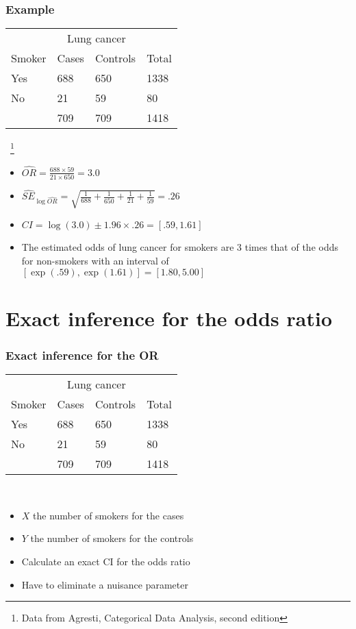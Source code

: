 \documentclass[aspectratio=169]{beamer}
\begin{document}
\begin{frame}\frametitle{Example}
\begin{center}
\ttfamily
  \begin{tabular}{llll}
& \multicolumn{2}{c}{Lung cancer} & \\ \cline{2-3}
Smoker & Cases & Controls & Total \\ \hline
Yes & 688 & 650 & 1338 \\
No  & 21  & 59  &   80 \\ \hline
    & 709 & 709 & 1418 
  \end{tabular}
\normalfont
\end{center}
~\footnote{Data from Agresti, Categorical Data Analysis, second edition}
\begin{itemize}
\item $\hat{OR} = \frac{688 \times 59}{21 \times 650} = 3.0$
\item $\hat{SE}_{\log \hat{OR}} = \sqrt{\frac{1}{688} + \frac{1}{650} + \frac{1}{21} + \frac{1}{59}} = .26$
\item $CI = \log(3.0) \pm 1.96 \times .26 = [.59, 1.61]$
\item The estimated odds of lung cancer for smokers are $3$ times
  that of the odds for non-smokers with an interval of 
  $[\exp(.59), \exp(1.61)] = [1.80, 5.00]$
\end{itemize}
\end{frame}

\section{Exact inference for the odds ratio}
\begin{frame}\frametitle{Exact inference for the OR}
\begin{center}
\ttfamily
  \begin{tabular}{llll}
& \multicolumn{2}{c}{Lung cancer} & \\ \cline{2-3}
Smoker & Cases & Controls & Total \\ \hline
Yes & 688 & 650 & 1338 \\
No  & 21  & 59  &   80 \\ \hline
    & 709 & 709 & 1418 
  \end{tabular}
\normalfont
\end{center}\ \\
\begin{itemize}
\item $X$ the number of smokers for the cases 
\item $Y$ the number of smokers for the controls
\item Calculate an exact CI for the odds ratio
\item Have to eliminate a nuisance parameter
\end{itemize}
\end{frame}
\end{document}
